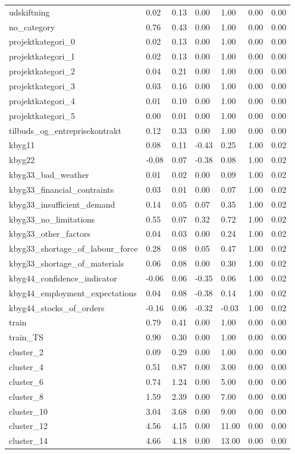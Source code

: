\begin{landscape}
\begin{longtable}[h!]{lllllll}
udskiftning & 0.02 & 0.13 & 0.00 & 1.00 & 0.00 & 0.00 \\
no_category & 0.76 & 0.43 & 0.00 & 1.00 & 0.00 & 0.00 \\
projektkategori_0 & 0.02 & 0.13 & 0.00 & 1.00 & 0.00 & 0.00 \\
projektkategori_1 & 0.02 & 0.13 & 0.00 & 1.00 & 0.00 & 0.00 \\
projektkategori_2 & 0.04 & 0.21 & 0.00 & 1.00 & 0.00 & 0.00 \\
projektkategori_3 & 0.03 & 0.16 & 0.00 & 1.00 & 0.00 & 0.00 \\
projektkategori_4 & 0.01 & 0.10 & 0.00 & 1.00 & 0.00 & 0.00 \\
projektkategori_5 & 0.00 & 0.01 & 0.00 & 1.00 & 0.00 & 0.00 \\
tilbuds_og_entreprisekontrakt & 0.12 & 0.33 & 0.00 & 1.00 & 0.00 & 0.00 \\
kbyg11 & 0.08 & 0.11 & -0.43 & 0.25 & 1.00 & 0.02 \\
kbyg22 & -0.08 & 0.07 & -0.38 & 0.08 & 1.00 & 0.02 \\
kbyg33_bad_weather & 0.01 & 0.02 & 0.00 & 0.09 & 1.00 & 0.02 \\
kbyg33_financial_contraints & 0.03 & 0.01 & 0.00 & 0.07 & 1.00 & 0.02 \\
kbyg33_insufficient_demand & 0.14 & 0.05 & 0.07 & 0.35 & 1.00 & 0.02 \\
kbyg33_no_limitations & 0.55 & 0.07 & 0.32 & 0.72 & 1.00 & 0.02 \\
kbyg33_other_factors & 0.04 & 0.03 & 0.00 & 0.24 & 1.00 & 0.02 \\
kbyg33_shortage_of_labour_force & 0.28 & 0.08 & 0.05 & 0.47 & 1.00 & 0.02 \\
kbyg33_shortage_of_materials & 0.06 & 0.08 & 0.00 & 0.30 & 1.00 & 0.02 \\
kbyg44_confidence_indicator & -0.06 & 0.06 & -0.35 & 0.06 & 1.00 & 0.02 \\
kbyg44_employment_expectations & 0.04 & 0.08 & -0.38 & 0.14 & 1.00 & 0.02 \\
kbyg44_stocks_of_orders & -0.16 & 0.06 & -0.32 & -0.03 & 1.00 & 0.02 \\
train & 0.79 & 0.41 & 0.00 & 1.00 & 0.00 & 0.00 \\
train_TS & 0.90 & 0.30 & 0.00 & 1.00 & 0.00 & 0.00 \\
cluster_2 & 0.09 & 0.29 & 0.00 & 1.00 & 0.00 & 0.00 \\
cluster_4 & 0.51 & 0.87 & 0.00 & 3.00 & 0.00 & 0.00 \\
cluster_6 & 0.74 & 1.24 & 0.00 & 5.00 & 0.00 & 0.00 \\
cluster_8 & 1.59 & 2.39 & 0.00 & 7.00 & 0.00 & 0.00 \\
cluster_10 & 3.04 & 3.68 & 0.00 & 9.00 & 0.00 & 0.00 \\
cluster_12 & 4.56 & 4.15 & 0.00 & 11.00 & 0.00 & 0.00 \\
cluster_14 & 4.66 & 4.18 & 0.00 & 13.00 & 0.00 & 0.00 \\
\end{longtable}\end{landscape}
